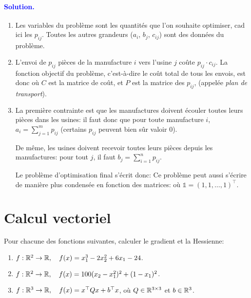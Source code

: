 \begin{hide}
\paragraph{\textcolor{blue}{Solution.}} 
\begin{enumerate}
	\item Les variables du problème sont les quantités que l'on souhaite optimiser, cad ici les $p_{ij}$. Toutes les autres grandeurs ($a_i$, $b_j$, $c_{ij}$) sont des données du problème.

	\item L'envoi de $p_{ij}$ pièces de la manufacture $i$ vers l'usine $j$ coûte $p_{ij} \cdot c_{ij}$. La fonction objectif du problème, c'est-à-dire le coût total de tous les envois, est donc
où $C$ est la matrice de coût, et $P$ est la matrice des $p_{ij}$, (appelée \textit{plan de transport}).

	\item La première contrainte est que les manufactures doivent écouler toutes leurs pièces dans les usines: il faut donc que pour toute manufacture $i$, $a_i = \sum_{j=1}^m p_{ij}$ (certains $p_{ij}$ peuvent bien sûr valoir $0$). 
	
	De même, les usines doivent recevoir toutes leurs pièces depuis les manufactures: pour tout $j$, il faut $b_j = \sum_{i=1}^n p_{ij}$.
	
	Le problème d'optimisation final s'écrit donc:
	Ce problème peut aussi s'écrire de manière plus condensée en fonction des matrices:
	où $\mathds{1} = (1,1,\ldots,1)^\top$.
\end{enumerate}
\end{hide}


\section{Calcul vectoriel}
Pour chacune des fonctions suivantes, calculer le gradient et la Hessienne:
\begin{enumerate}
	\item $f:\mathbb{R}^2 \to \mathbb{R}, \quad f(x) = x_1^3 - 2x_2^2 + 6x_1 - 24$.
	\item $f:\mathbb{R}^2 \to \mathbb{R}, \quad f(x) = 100(x_2 - x_1^2)^2 + (1-x_1)^2$.
	\item $f:\mathbb{R}^3 \to \mathbb{R}, \quad f(x) = x^\top Q x + b^\top x$, où $Q \in \mathbb{R}^{3\times 3}$ et $b \in \mathbb{R}^3$.
\end{enumerate}

